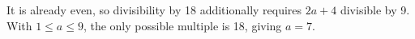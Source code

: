 It is already even, so divisibility by 18 additionally requires $2a+4$ divisible by 9. With $1\le a\le9$, the only possible multiple is 18, giving $\boxed{a=7}$.
